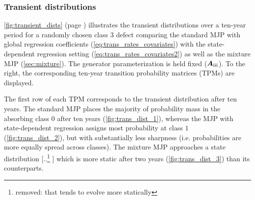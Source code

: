 \documentclass{article}
\newcommand{\RN}[1]{\textup{\uppercase\expandafter{\romannumeral#1}}}
\providecommand{\DIFadd}[1]{{\protect\color{blue} \sf #1}} %
\providecommand{\DIFdel}[1]{{\protect\color{red} [..\footnote{removed: #1} ]}} %
\providecommand{\DIFaddbegin}{} %
\providecommand{\DIFaddend}{} %
\providecommand{\DIFdelbegin}{} %
\providecommand{\DIFdelend}{} %
\begin{document}
\subsubsection{Transient distributions}

\cref{fig:transient_dists} (page \pageref{fig:transient_dists}) illustrates the transient distributions over a ten-year period for a randomly chosen class $3$ defect
comparing the standard MJP with global regression coefficients (\cref{eq:trans_rates_covariates}) with the state-dependent regression setting (\cref{eq:trans_rates_covariates2}) as well as the mixture MJP (\cref{sec:mixture}). The generator parameterization is held fixed ($\bm{A}_{\RN{3}}$). To the right, the corresponding ten-year transition probability matrices (TPMs) are displayed.



The first row of each TPM corresponds to the transient distribution after ten years. 
The standard MJP places the majority of probability mass in the absorbing class $0$ after ten years (\cref{fig:trans_dist_1}), whereas the MJP with state-dependent regression assigns most probability at class $1$ (\cref{fig:trans_dist_2}), but with substantially less sharpness (i.e. probabilities are more equally spread across classes). The mixture MJP approaches a state distribution \DIFdelbegin \DIFdel{that tends to evolve more statically }\DIFdelend \DIFaddbegin \DIFadd{which is more static }\DIFaddend after two years (\cref{fig:trans_dist_3}) than its counterparts.
\end{document}

